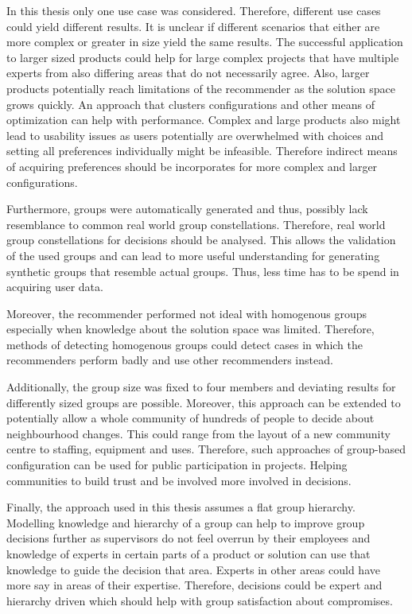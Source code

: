 In this thesis only one use case was considered. Therefore, different use cases could yield different results. It is unclear if different scenarios that either are more complex or greater in size yield the same results. The successful application to larger sized products could help for large complex projects that have multiple experts from also differing areas that do not necessarily agree. Also, larger products potentially reach limitations of the recommender as the solution space grows quickly. An approach that clusters configurations and other means of optimization can help with performance. Complex and large products also might lead to usability issues as users potentially are overwhelmed with choices and setting all preferences individually might be infeasible. Therefore indirect means of acquiring preferences should be incorporates for more complex and larger configurations. 

Furthermore, groups were automatically generated and thus, possibly lack resemblance to common real world group constellations. Therefore, real world group constellations for decisions should be analysed. This allows the validation of the used groups and can lead to more useful understanding for generating synthetic groups that resemble actual groups. Thus, less time has to be spend in acquiring user data.

Moreover, the recommender performed not ideal with homogenous groups especially when knowledge about the solution space was limited. Therefore, methods of detecting homogenous groups could detect cases in which the recommenders perform badly and use other recommenders instead.

Additionally, the group size was fixed to four members and deviating results for differently sized groups are possible. Moreover, this approach can be extended to potentially allow a whole community of hundreds of people to decide about neighbourhood changes. This could range from the layout of a new community centre to staffing, equipment and uses. Therefore, such approaches of group-based configuration can be used for public participation in projects. Helping communities to build trust and be involved more involved in decisions.

Finally, the approach used in this thesis assumes a flat group hierarchy. Modelling knowledge and hierarchy of a group can help to improve group decisions further as supervisors do not feel overrun by their employees and knowledge of experts in certain parts of a product or solution can use that knowledge to guide the decision that area. Experts in other areas could have more say in areas of their expertise. Therefore, decisions could be expert and hierarchy driven which should help with group satisfaction about compromises.